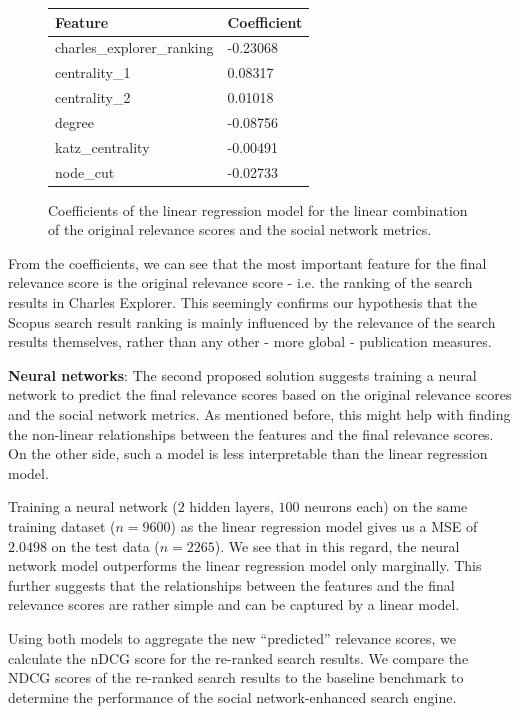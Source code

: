 \begin{figure}[!ht]
    \captionsetup{width=.9\linewidth}
    \centering
    \begin{tabular}{|l|l|}
    \hline
        \textbf{Feature} & \textbf{Coefficient} \\ \hline
        charles\_explorer\_ranking & -0.23068 \\ \hline
        centrality\_1 & 0.08317 \\ \hline
        centrality\_2 & 0.01018 \\ \hline
        degree & -0.08756 \\ \hline
        katz\_centrality & -0.00491 \\ \hline
        node\_cut & -0.02733 \\ \hline
    \end{tabular}
    \caption{Coefficients of the linear regression model for the linear combination of the original relevance scores and the social network metrics.}
\end{figure}

From the coefficients, we can see that the most important feature for the final relevance score is the original relevance score - i.e. the ranking of the search results in Charles Explorer.
This seemingly confirms our hypothesis that the Scopus search result ranking is mainly influenced by the relevance of the search results themselves, rather than any other - more global - publication measures.

\textbf{Neural networks}: The second proposed solution suggests training a neural network to predict the final relevance scores based on the original relevance scores and the social network metrics.
As mentioned before, this might help with finding the non-linear relationships between the features and the final relevance scores.
On the other side, such a model is less interpretable than the linear regression model.

Training a neural network ($2$ hidden layers, $100$ neurons each) on the same training dataset ($n=9600$) as the linear regression model gives us a \ac{MSE} of $2.0498$ on the test data ($n=2265$).
We see that in this regard, the neural network model outperforms the linear regression model only marginally.
This further suggests that the relationships between the features and the final relevance scores are rather simple and can be captured by a linear model.

Using both models to aggregate the new ``predicted'' relevance scores, we calculate the nDCG score for the re-ranked search results.
We compare the NDCG scores of the re-ranked search results to the baseline benchmark to determine the performance of the social network-enhanced search engine.

